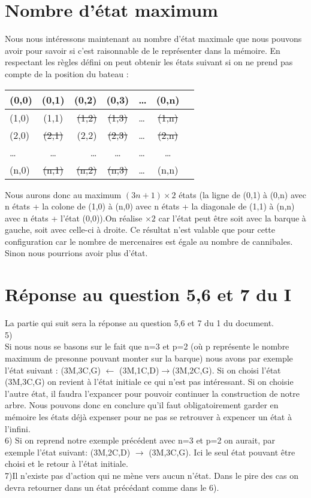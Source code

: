 \documentclass[a4paper, 12pt, french]{book}
\begin{document}
\section{Nombre d'état maximum}
Nous nous intéressons maintenant au nombre d'état maximale que nous pouvons avoir pour savoir si c'est raisonnable de le représenter dans la mémoire. En respectant les règles défini on peut obtenir les états suivant si on ne prend pas compte de la position du bateau :
\begin{tabular}{|l|c|r|c|l|c|r|}
    \hline
    (0,0)        & (0,1) & (0,2) & (0,3) & \dots & (0,n) \\
    \hline
    (1,0)        &
    (1,1)        &
    \sout{(1,2)} &
    \sout{(1,3)} & \dots &
    \sout{(1,n)}                                         \\
    \hline
    (2,0)        &
    \sout{(2,1)} &
    (2,2)        &
    \sout{(2,3)} & \dots &
    \sout{(2,n)}                                         \\
    \hline
    \dots        & \dots & \dots & \dots & \dots & \dots \\
    \hline
    (n,0)        &
    \sout{(n,1)} &
    \sout{(n,2)} &
    \sout{(n,3)} & \dots & (n,n)                         \\
    \hline
\end{tabular}
Nous aurons donc au maximum $(3n+1)\times2$ états (la ligne de (0,1) à (0,n) avec n états + la colone de (1,0) à (n,0) avec n états + la diagonale de (1,1) à (n,n) avec n états + l'état (0,0)).On réalise $\times 2$ car l'état peut être soit avec la barque à gauche, soit avec celle-ci à droite. Ce résultat n'est valable que pour cette configuration car le nombre de mercenaires est égale au nombre de cannibales. Sinon nous pourrions avoir plus d'état.
\section{Réponse au question 5,6 et 7 du I}
La partie qui suit sera la réponse au question 5,6 et 7 du 1 du document. \\
5) \\
Si nous nous se basons sur le fait que n=3 et p=2 (où p représente le nombre maximum de presonne pouvant monter sur la barque) nous avons par exemple l'état suivant :
(3M,3C,G) $\leftarrow$ (3M,1C,D)$\rightarrow$(3M,2C,G). Si on choisi l'état (3M,3C,G) on revient à l'état initiale ce qui n'est pas intéressant. Si on choisie l'autre état, il faudra l'expancer pour pouvoir continuer la construction de notre arbre. Nous pouvons donc en conclure qu'il faut obligatoirement garder en mémoire les états déjà expenser pour ne pas se retrouver à expencer un état à l'infini.\\
6) Si on reprend notre exemple précédent avec n=3 et p=2 on aurait, par exemple l'état suivant: (3M,2C,D) $\rightarrow$ (3M,3C,G). Ici le seul état pouvant être choisi et le retour à l'état initiale.\\
7)Il n'existe pas d'action qui ne mène vers aucun n'état. Dans le pire des cas on devra retourner dans un état précédant comme dans le 6). \\
\end{document}
